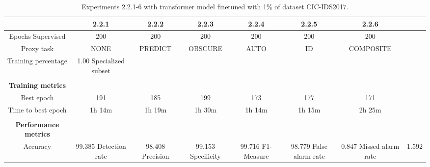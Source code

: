 \begin{table}[htb]
    \centering
    \begin{tabular}{@{}ccccccc@{}}
        \toprule
         & 2.2.1 & 2.2.2 & 2.2.3 & 2.2.4 & 2.2.5 & 2.2.6 \\
        \midrule
        Epochs Supervised &  200 &  200 &  200 &  200 &  200 &  200 \\
        Proxy task &  NONE &  PREDICT &  OBSCURE &  AUTO &  ID &  COMPOSITE \\
        Training percentage &  1.00 %
        Specialized subset &   &   &   &   &   &   \\
         \\
        \textbf{Training metrics} &  &  &  &  &  &  \\
        Best epoch &  191 &  185 &  199 &  173 &  177 &  171 \\
        Time to best epoch &  1h 14m &  1h 19m &  1h 30m &  1h 14m &  1h 15m &  2h 25m \\
         \\
        \textbf{Performance metrics} &  &  &  &  &  &  \\
        Accuracy &  99.385 %
        Detection rate &  98.408 %
        Precision &  99.153 %
        Specificity &  99.716 %
        F1-Measure &  98.779 %
        False alarm rate &  0.847 %
        Missed alarm rate &  1.592 %
        \bottomrule
    \end{tabular}
    \caption{Experiments 2.2.1-6 with transformer model finetuned with 1\% of dataset CIC-IDS2017.}
    \label{table:results:lstm:stats_flows_1}
\end{table}